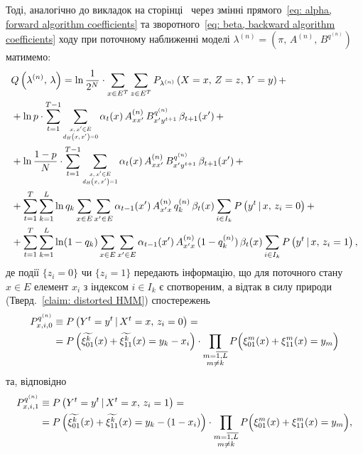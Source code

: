 Тоді, аналогічно до викладок на сторінці~\pageref{eq: conditional probability} через змінні прямого~\eqref{eq: alpha, forward algorithm coefficients} та зворотного~\eqref{eq: beta, backward algorithm coefficients} ходу при поточному наближенні моделі $\lambda^{(n)}=(\pi,\,A^{(n)},\,B^{q^{(n)}})$ матимемо:
\begin{align*}
    &Q\left( \lambda^{(n)},\,\lambda \right) = \ln \frac{1}{2^N} \cdot \sum\limits_{x \in E^T} \sum\limits_{z \in E^T} P_{\lambda^{(n)}} \left( X=x,\,Z=z,\,Y=y \right) + \\
    &+ \ln p \cdot \sum\limits_{t=1}^{T-1} \sum\limits_{\scaleq[0.8]{\substack{x,\,x' \in E \\ d_H\left( x,\,x' \right) = 0}}} \alpha_t(x)\,A^{(n)}_{xx'}\,B^{q^{(n)}}_{x'y^{t+1}}\,\beta_{t+1}(x')\, + \\ 
    &+ \ln \frac{1-p}{N} \cdot \sum\limits_{t=1}^{T-1} \sum\limits_{\scaleq[0.8]{\substack{x,\,x' \in E \\ d_H\left( x,\,x' \right) = 1}}} \alpha_t(x)\,A^{(n)}_{xx'}\,B^{q^{(n)}}_{x'y^{t+1}}\,\beta_{t+1}(x')\, + \\
    &+ \sum\limits_{t=1}^T \sum\limits_{k=1}^L \ln{q_k} \sum\limits_{x \in E} \sum\limits_{x' \in E} \alpha_{t-1}(x')\,A^{(n)}_{x'x}\, q^{(n)}_k\, \beta_t(x) \sum\limits_{i \in I_k} P\left( y^t \,|\, x,\,z_i=0 \right) + \\
    &+ \sum\limits_{t=1}^T \sum\limits_{k=1}^L \ln(1-q_k) \sum\limits_{x \in E} \sum\limits_{x' \in E} \alpha_{t-1}(x')\,A^{(n)}_{x'x}\, (1-q^{(n)}_k)\, \beta_t(x) \sum\limits_{i \in I_k} P\left( y^t \,|\, x,\,z_i=1 \right),
\end{align*}
де події $\{ z_i=0 \}$ чи $\{ z_i=1 \}$ передають інформацію, що для поточного стану $x \in E$ елемент $x_i$ з індексом $i \in I_k$ є спотвореним, а відтак в силу природи (Тверд.~\ref{claim: distorted HMM}) спостережень 
\begin{align*}
    P^{q^{(n)}}_{x,i,0} &\equiv P\left( Y^t=y^t \,|\, X^t=x,\,z_i=0 \right) = \\ 
    &= P\left( \widetilde{\xi^k_{01}}(x) + \widetilde{\xi^k_{11}}(x) = y_k - x_i \right) \cdot \prod\limits_{\substack{m = \overline{1,L} \\ m \neq k}} P\Bigl( \xi^m_{01}(x) + \xi^m_{11}(x) = y_m \Bigr)
\end{align*}
та, відповідно
\begin{align*}
    P^{q^{(n)}}_{x,i,1} &\equiv P\left( Y^t=y^t \,|\, X^t=x,\,z_i=1 \right) = \\ 
    &= P\left( \widetilde{\xi^k_{01}}(x) + \widetilde{\xi^k_{11}}(x) = y_k - (1 - x_i) \right) \cdot  \prod\limits_{\substack{m = \overline{1,L} \\ m \neq k}} P\Bigl( \xi^m_{01}(x) + \xi^m_{11}(x) = y_m \Bigr),
\end{align*}
